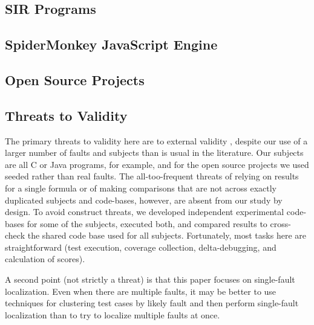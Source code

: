 \subsection{SIR Programs}


\subsection{SpiderMonkey JavaScript Engine}


\subsection{Open Source Projects}
\label{sec:opensource}



\subsection{Threats to Validity}

The primary threats to validity here are to external validity
\cite{Threats}, despite our use of a larger number of faults and
subjects than is usual in the literature.  Our subjects are all C or
Java programs, for example, and for the open source projects we used
seeded rather than real faults.  The all-too-frequent threats
\cite{Threats} of relying on results for a single formula or of making
comparisons that are not across exactly duplicated subjects and
code-bases, however, are absent from our study by design.  To avoid
construct threats, we developed independent experimental code-bases
for some of the subjects, executed both, and compared results to
cross-check the shared code base used for all subjects.  Fortunately,
most tasks here are straightforward (test execution, coverage
collection, delta-debugging, and calculation of scores).

A second point (not strictly a threat) is that this paper focuses on
single-fault localization.    Even when
there are multiple faults, it may be better to use techniques for
clustering test cases by likely fault 
\cite{Jones07,PLDI13,Podgurski03,Podgurski04} and then perform
single-fault localization than to try to localize multiple faults at
once.
